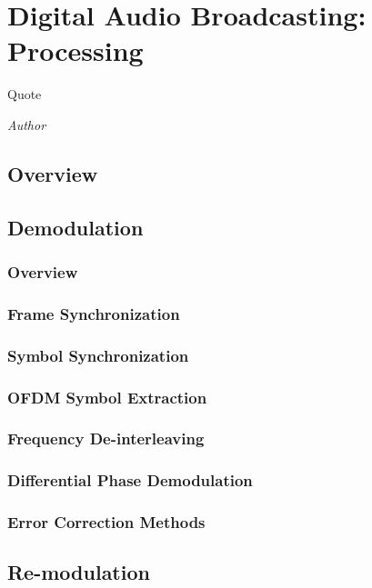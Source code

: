 \documentclass[class=report,11pt,crop=false]{standalone}
\begin{document}
\chapter{Digital Audio Broadcasting: Processing}
\epigraph{Quote}%
    {\emph{Author}}

\section{Overview}

\blindmathpaper

\section{Demodulation}
\blindmathpaper

\subsection{Overview}
\subsection{Frame Synchronization}
\blindmathpaper
\subsection{Symbol Synchronization}
\blindmathpaper
\subsection{OFDM Symbol Extraction}
\blindmathpaper
\subsection{Frequency De-interleaving}
\blindmathpaper
\subsection{Differential Phase Demodulation}
\blindmathpaper
\subsection{Error Correction Methods}
\blindmathpaper


\section{Re-modulation}
\end{document}
